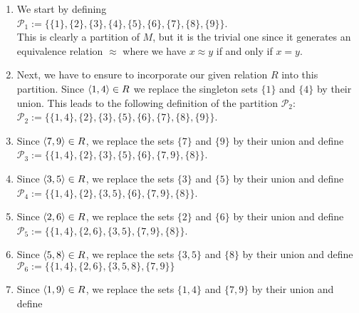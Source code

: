 \begin{enumerate}
\item We start by defining
      \\[0.2cm]
      \hspace*{1.3cm}
      $\mathcal{P}_1 := \bigl\{ \{1\}, \{2\}, \{3\}, \{4\}, \{5\}, \{6\}, \{7\}, \{8\}, \{9\} \bigr\}$.
      \\[0.2cm]
      This is clearly a partition of $M$, but it is the trivial one since it generates an equivalence
      relation $\approx$ where we have  $x \approx y$ if and only if $x = y$.  
\item Next, we have to ensure to incorporate our given relation $R$ into this partition.  Since $\pair(1,4) \in R$
      we replace the singleton sets $\{1\}$ and $\{4\}$ by their union.  This leads to the following
      definition of the partition $\mathcal{P}_2$:
      \\[0.2cm]
      \hspace*{1.3cm}
      $\mathcal{P}_2 := \bigl\{ \{1, 4\}, \{2\}, \{3\}, \{5\}, \{6\}, \{7\}, \{8\}, \{9\} \bigr\}$.
\item Since $\pair(7,9) \in R$, we replace the sets $\{7\}$ and $\{9\}$ by their union and define
      \\[0.2cm]
      \hspace*{1.3cm}
      $\mathcal{P}_3 := \bigl\{ \{1, 4\}, \{2\}, \{3\}, \{5\}, \{6\}, \{7, 9\}, \{8\} \bigr\}$.
\item Since $\pair(3,5) \in R$, we replace the sets $\{3\}$ and $\{5\}$ by their union and define
      \\[0.2cm]
      \hspace*{1.3cm}
      $\mathcal{P}_4 := \bigl\{ \{1, 4\}, \{2\}, \{3,5\}, \{6\}, \{7, 9\}, \{8\} \bigr\}$.
\item Since $\pair(2,6) \in R$, we replace the sets $\{2\}$ and $\{6\}$ by their union and define
      \\[0.2cm]
      \hspace*{1.3cm}
      $\mathcal{P}_5 := \bigl\{ \{1, 4\}, \{2,6\}, \{3,5\}, \{7, 9\}, \{8\} \bigr\}$.
\item Since $\pair(5,8) \in R$, we replace the sets $\{3,5\}$ and $\{8\}$ by their union and define
      \\[0.2cm]
      \hspace*{1.3cm}
      $\mathcal{P}_6 := \bigl\{ \{1, 4\}, \{2,6\}, \{3,5,8\}, \{7, 9\} \bigr\}$
\item Since $\pair(1,9) \in R$, we replace the sets $\{1,4\}$ and $\{7,9\}$ by their union and define

\end{enumerate}
